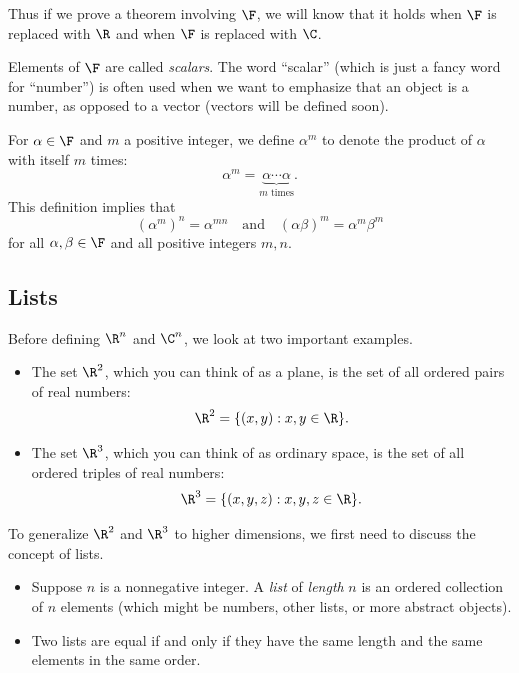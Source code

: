 %
Thus if we prove a theorem involving $\F$, we will know that it holds when
$\F$ is replaced with $\R$ and when $\F$ is replaced with $\C$.

Elements of $\F$ are called \emph{scalars}. The word ``scalar'' (which is just
a fancy word for ``number'') is often used when we want to emphasize that an
object is a number, as opposed to a vector (vectors will be defined soon).

For $\alpha\in\F$ and $m$ a positive integer, we define $\alpha^m$ to denote
the product of $\alpha$ with itself $m$ times:
\[ \alpha^m = \underbrace{\alpha\cdots\alpha}_{m\text{ times}}. \]
This definition implies that
\[ (\alpha^m)^n = \alpha^{mn} \quad\text{and}\quad (\alpha\beta)^m = \alpha^m\beta^m \]
for all $\alpha,\beta\in\F$ and all positive integers $m,n$.

\subsection{Lists}

Before defining $\R^n$ and $\C^n$, we look at two important examples.

\begin{example}[$\R^2$ and $\R^3$]\label{ax:1.7}\leavevmode
\begin{itemize}
\item The set $\R^2$, which you can think of as a plane, is the set of all
  ordered pairs of real numbers:
  \[ \R^2 = \{(x,y) : x,y\in\R\}. \]
\item The set $\R^3$, which you can think of as ordinary space, is the set of
  all ordered triples of real numbers:
  \[ \R^3 = \{(x,y,z) : x,y,z\in\R\}. \]
\end{itemize}
\end{example}

To generalize $\R^2$ and $\R^3$ to higher dimensions, we first need to discuss
the concept of lists.

\begin{definition}\label{ax:1.8}\leavevmode
\begin{itemize}
\item Suppose $n$ is a nonnegative integer. A \emph{list} of \emph{length} $n$
  is an ordered collection of $n$ elements (which might be numbers, other
  lists, or more abstract objects).
\item Two lists are equal if and only if they have the same length and the
  same elements in the same order.
\end{itemize}
\end{definition}

